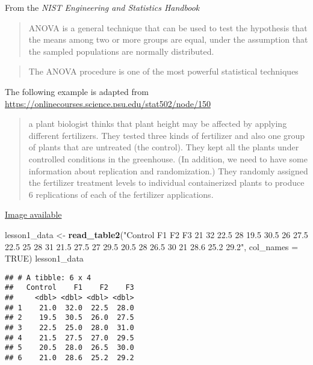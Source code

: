 \documentclass[]{book}
\newenvironment{Shaded}{\begin{snugshade}}{\end{snugshade}}
\newcommand{\DataTypeTok}[1]{\textcolor[rgb]{0.13,0.29,0.53}{#1}}
\newcommand{\KeywordTok}[1]{\textcolor[rgb]{0.13,0.29,0.53}{\textbf{#1}}}
\newcommand{\NormalTok}[1]{#1}
\newcommand{\OtherTok}[1]{\textcolor[rgb]{0.56,0.35,0.01}{#1}}
\newcommand{\StringTok}[1]{\textcolor[rgb]{0.31,0.60,0.02}{#1}}
\theoremstyle{definition}
\theoremstyle{definition}
\theoremstyle{definition}
\theoremstyle{remark}
\begin{document}
From the \emph{NIST Engineering and Statistics Handbook}

\begin{quote}
ANOVA is a general technique that can be used to test the hypothesis
that the means among two or more groups are equal, under the assumption
that the sampled populations are normally distributed.
\end{quote}

\begin{quote}
The ANOVA procedure is one of the most powerful statistical techniques
\end{quote}

The following example is adapted from
\url{https://onlinecourses.science.psu.edu/stat502/node/150}

\begin{quote}
a plant biologist thinks that plant height may be affected by applying
different fertilizers. They tested three kinds of fertilizer and also
one group of plants that are untreated (the control). They kept all the
plants under controlled conditions in the greenhouse. (In addition, we
need to have some information about replication and randomization.) They
randomly assigned the fertilizer treatment levels to individual
containerized plants to produce 6 replications of each of the fertilizer
applications.
\end{quote}

\href{https://onlinecourses.science.psu.edu/stat502/node/235}{Image
available}

\begin{Shaded}
\begin{Highlighting}[]
\NormalTok{lesson1_data <-}\StringTok{ }\KeywordTok{read_table2}\NormalTok{(}\StringTok{"Control    F1  F2  F3}
\StringTok{21  32  22.5    28}
\StringTok{19.5    30.5    26  27.5}
\StringTok{22.5    25  28  31}
\StringTok{21.5    27.5    27  29.5}
\StringTok{20.5    28  26.5    30}
\StringTok{21  28.6    25.2    29.2"}\NormalTok{, }\DataTypeTok{col_names =} \OtherTok{TRUE}\NormalTok{)}
\NormalTok{lesson1_data}
\end{Highlighting}
\end{Shaded}

\begin{verbatim}
## # A tibble: 6 x 4
##   Control    F1    F2    F3
##     <dbl> <dbl> <dbl> <dbl>
## 1    21.0  32.0  22.5  28.0
## 2    19.5  30.5  26.0  27.5
## 3    22.5  25.0  28.0  31.0
## 4    21.5  27.5  27.0  29.5
## 5    20.5  28.0  26.5  30.0
## 6    21.0  28.6  25.2  29.2
\end{verbatim}
\end{document}
